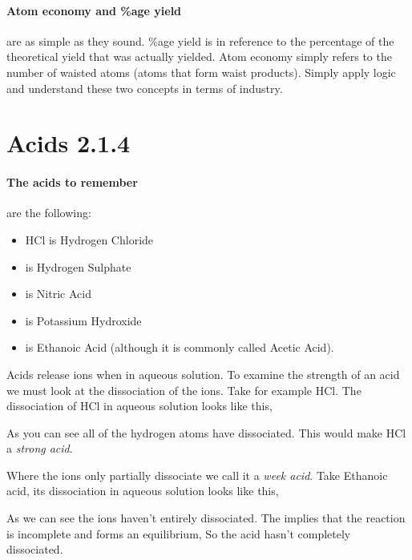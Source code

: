     \paragraph{Atom economy and \%age yield} are as simple as they sound. \%age yield is in reference to the percentage of the theoretical yield that was actually yielded. Atom economy simply refers to the number of waisted atoms (atoms that form waist products). Simply apply logic and understand these two concepts in terms of industry.
    
\section{Acids 2.1.4}

	\paragraph{The acids to remember} are the following:
	\begin{itemize}
		\item HCl is Hydrogen Chloride
		\item {} is Hydrogen Sulphate
		\item {} is Nitric Acid
		\item {} is Potassium Hydroxide
		\item {} is Ethanoic Acid (although it is commonly called Acetic Acid).
	\end{itemize}
	
	Acids release  ions when in aqueous solution. To examine the strength of an acid we must look at the dissociation of the  ions. Take for example HCl. The dissociation of HCl in aqueous solution looks like this, 
	\begin{center}
	\end{center}
	As you can see all of the hydrogen atoms have dissociated. This would make HCl a \textit{strong acid}. 
	
	Where the  ions only partially dissociate we call it a \textit{week acid}. Take Ethanoic acid, its dissociation in aqueous solution looks like this, 
	\begin{center}
	\end{center}
	 As we can see the  ions haven't entirely dissociated. The \ch{<=>} implies that the reaction is incomplete and forms an equilibrium, So the acid hasn't completely dissociated.
	
